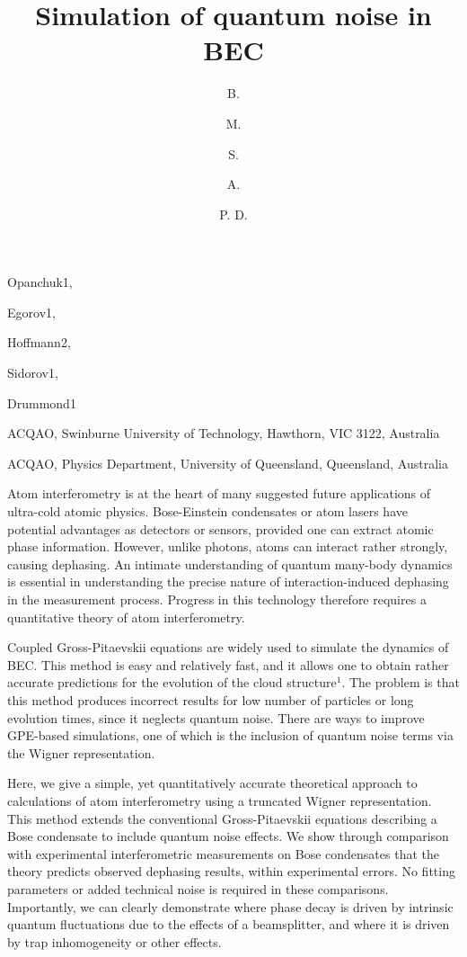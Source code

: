 \documentclass[10pt]{article}
\begin{document}

\title{Simulation of quantum noise in BEC}

\begin{authors}
 \author{B.}{Opanchuk}{1},
  \author{M.}{Egorov}{1},
  \author{S.}{Hoffmann}{2},
  \author{A.}{Sidorov}{1},
    \author{P. D.}{Drummond}{1}
\end{authors}

\address{1}{ACQAO, Swinburne University of Technology, Hawthorn, VIC 3122, Australia}
\address{2}{ACQAO, Physics Department, University of Queensland, Queensland, Australia}


\begintext

Atom interferometry is at the heart of many suggested future applications of ultra-cold atomic physics. Bose-Einstein condensates or atom lasers have potential advantages as detectors or sensors, provided one can extract atomic phase information. However, unlike photons, atoms can interact rather strongly, causing dephasing. An intimate understanding of quantum many-body dynamics is essential in understanding the precise nature of interaction-induced dephasing in the measurement process. Progress in this technology therefore requires a quantitative theory of atom interferometry.

Coupled Gross-Pitaevskii equations are widely used to simulate the dynamics of BEC. This method is easy and relatively fast, and it allows one to obtain rather accurate predictions for the evolution of the cloud structure$^1$. The problem is that this method  produces incorrect results for low number of particles or long evolution times, since it neglects quantum noise. There are ways to improve GPE-based simulations, one of which is the inclusion of quantum noise terms via the Wigner representation. 

Here, we give a simple, yet quantitatively accurate theoretical approach to calculations of atom interferometry using a truncated Wigner representation. This method extends the conventional Gross-Pitaevskii equations describing a Bose condensate to include quantum noise effects. We show through comparison with experimental interferometric measurements on Bose condensates that the theory predicts observed dephasing results, within experimental errors. No fitting parameters or added technical noise is required in these comparisons.  Importantly, we can clearly demonstrate where phase decay is driven by intrinsic quantum fluctuations due to the effects of a beamsplitter, and where it is driven by trap inhomogeneity or other effects.
\end{document}
